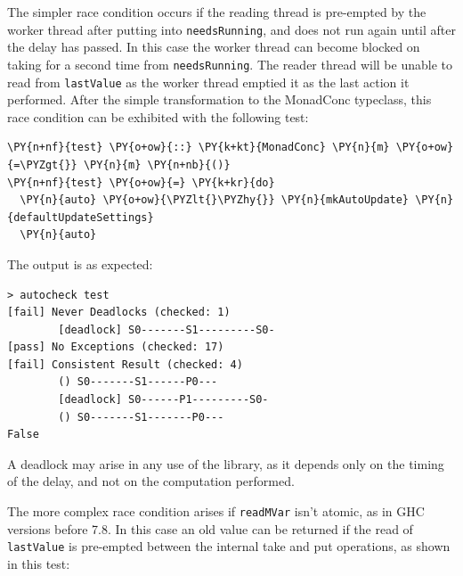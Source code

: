 The simpler race condition occurs if the reading thread is pre-empted
by the worker thread after putting into \texttt{needsRunning}, and
does not run again until after the delay has passed. In this case the
worker thread can become blocked on taking for a second time from
\texttt{needsRunning}. The reader thread will be unable to read from
\texttt{lastValue} as the worker thread emptied it as the last action
it performed. After the simple transformation to the MonadConc
typeclass, this race condition can be exhibited with the following
test:


\begin{Verbatim}[commandchars=\\\{\}]
\PY{n+nf}{test} \PY{o+ow}{::} \PY{k+kt}{MonadConc} \PY{n}{m} \PY{o+ow}{=\PYZgt{}} \PY{n}{m} \PY{n+nb}{()}
\PY{n+nf}{test} \PY{o+ow}{=} \PY{k+kr}{do}
  \PY{n}{auto} \PY{o+ow}{\PYZlt{}\PYZhy{}} \PY{n}{mkAutoUpdate} \PY{n}{defaultUpdateSettings}
  \PY{n}{auto}
\end{Verbatim}


The output is as expected:

\begin{verbatim}
> autocheck test
[fail] Never Deadlocks (checked: 1)
        [deadlock] S0-------S1---------S0-
[pass] No Exceptions (checked: 17)
[fail] Consistent Result (checked: 4)
        () S0-------S1------P0---
        [deadlock] S0------P1---------S0-
        () S0-------S1-------P0---
False
\end{verbatim}

A deadlock may arise in any use of the library, as it depends only on
the timing of the delay, and not on the computation performed.

The more complex race condition arises if \texttt{readMVar} isn't
atomic, as in GHC versions before 7.8. In this case an old value can
be returned if the read of \texttt{lastValue} is pre-empted between
the internal take and put operations, as shown in this test:



